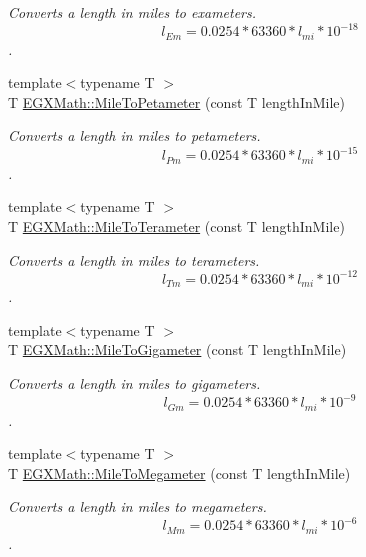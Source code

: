 \begin{DoxyCompactItemize}
\begin{DoxyCompactList}\small\item\em Converts a length in miles to exameters. \[ l_{Em}=0.0254 * 63360 * l_{mi} * 10^{-18} \]. \end{DoxyCompactList}\item 
{\footnotesize template$<$typename T $>$ }\\T \mbox{\hyperlink{group___e_g_x_math-_conversions-_length_conversions-_imperial-_mile-_s_i_ga3371527a512df8e154f5c3b4703108e0}{E\+G\+X\+Math\+::\+Mile\+To\+Petameter}} (const T length\+In\+Mile)
\begin{DoxyCompactList}\small\item\em Converts a length in miles to petameters. \[ l_{Pm}=0.0254 * 63360 * l_{mi} * 10^{-15} \]. \end{DoxyCompactList}\item 
{\footnotesize template$<$typename T $>$ }\\T \mbox{\hyperlink{group___e_g_x_math-_conversions-_length_conversions-_imperial-_mile-_s_i_gaebf59d9cdca70b0714a8740790cbe355}{E\+G\+X\+Math\+::\+Mile\+To\+Terameter}} (const T length\+In\+Mile)
\begin{DoxyCompactList}\small\item\em Converts a length in miles to terameters. \[ l_{Tm}=0.0254 * 63360 * l_{mi} * 10^{-12} \]. \end{DoxyCompactList}\item 
{\footnotesize template$<$typename T $>$ }\\T \mbox{\hyperlink{group___e_g_x_math-_conversions-_length_conversions-_imperial-_mile-_s_i_gac8c76e568a7a7f5c544b70808d85c61b}{E\+G\+X\+Math\+::\+Mile\+To\+Gigameter}} (const T length\+In\+Mile)
\begin{DoxyCompactList}\small\item\em Converts a length in miles to gigameters. \[ l_{Gm}=0.0254 * 63360 * l_{mi} * 10^{-9} \]. \end{DoxyCompactList}\item 
{\footnotesize template$<$typename T $>$ }\\T \mbox{\hyperlink{group___e_g_x_math-_conversions-_length_conversions-_imperial-_mile-_s_i_ga3b369ccb3f0fc38098abdba01110910b}{E\+G\+X\+Math\+::\+Mile\+To\+Megameter}} (const T length\+In\+Mile)
\begin{DoxyCompactList}\small\item\em Converts a length in miles to megameters. \[ l_{Mm}=0.0254 * 63360 * l_{mi} * 10^{-6} \]. \end{DoxyCompactList}\item 

\end{DoxyCompactItemize}
